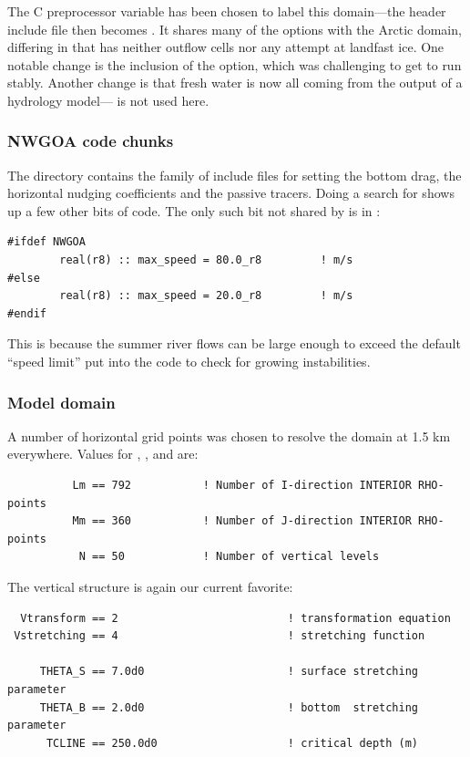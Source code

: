 \subsubsection{}
The C preprocessor variable  has been chosen to label
this domain---the header include file then becomes .
It shares many of the options with the Arctic domain, differing in
that has neither outflow cells nor any attempt at landfast ice. One
notable change is the inclusion of the  option, which
was challenging to get to run stably. Another change is that fresh water
is now all coming from the output of a hydrology model---
is not used here.

\subsubsection{NWGOA code chunks}
The  directory contains the  family
of include files for setting the bottom drag, the horizontal nudging
coefficients and the passive tracers. Doing a search for 
shows up a few other bits of code. The only such bit not shared
by  is in :
\begin{verbatim}
#ifdef NWGOA
        real(r8) :: max_speed = 80.0_r8         ! m/s
#else
        real(r8) :: max_speed = 20.0_r8         ! m/s
#endif
\end{verbatim}
This is because the summer river flows can be large enough to
exceed the default ``speed limit'' put into the code to check for growing
instabilities. 

\subsubsection{Model domain}
A number of horizontal grid points was chosen to resolve the
domain at 1.5 km everywhere. Values
for , , and  are:
\begin{verbatim}
          Lm == 792           ! Number of I-direction INTERIOR RHO-points
          Mm == 360           ! Number of J-direction INTERIOR RHO-points
           N == 50            ! Number of vertical levels
\end{verbatim}
The vertical structure is again our current favorite:
\begin{verbatim}
  Vtransform == 2                          ! transformation equation
 Vstretching == 4                          ! stretching function

     THETA_S == 7.0d0                      ! surface stretching parameter
     THETA_B == 2.0d0                      ! bottom  stretching parameter
      TCLINE == 250.0d0                    ! critical depth (m)
\end{verbatim}

